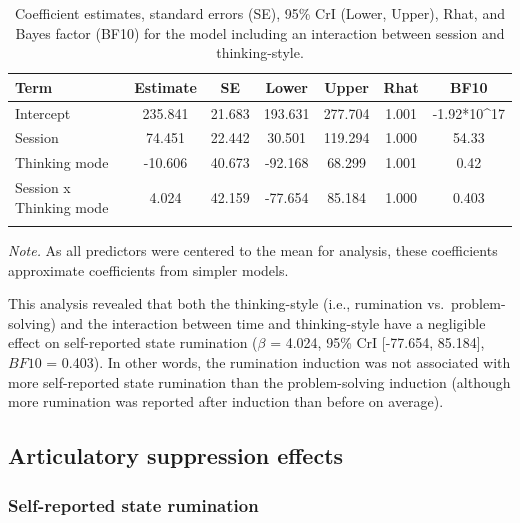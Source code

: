 \documentclass[a4paper,12pt,twoside,onecolumn,openright,final,oldfontcommands]{memoir}
\begin{document}
\begin{table}[H]
\begin{center}
\begin{threeparttable}
\caption{\label{tab:ParamInteraction}Coefficient estimates, standard errors (SE), 95\% CrI (Lower, Upper), Rhat, and Bayes factor (BF10) for the model including an interaction between session and thinking-style.}
\small{
\begin{tabular}{lcccccc}
\toprule
Term & \multicolumn{1}{c}{Estimate} & \multicolumn{1}{c}{SE} & \multicolumn{1}{c}{Lower} & \multicolumn{1}{c}{Upper} & \multicolumn{1}{c}{Rhat} & \multicolumn{1}{c}{BF10}\\
\midrule
Intercept & 235.841 & 21.683 & 193.631 & 277.704 & 1.001 & -1.92*10\textasciicircum{}17\\
Session & 74.451 & 22.442 & 30.501 & 119.294 & 1.000 & 54.33\\
Thinking mode & -10.606 & 40.673 & -92.168 & 68.299 & 1.001 & 0.42\\
Session x Thinking mode & 4.024 & 42.159 & -77.654 & 85.184 & 1.000 & 0.403\\
\bottomrule
\addlinespace
\end{tabular}
}
\begin{tablenotes}[para]
\textit{Note.} As all predictors were centered to the mean for analysis, these coefficients approximate coefficients from simpler models.
\end{tablenotes}
\end{threeparttable}
\end{center}
\end{table}

This analysis revealed that both the thinking-style (i.e., rumination vs.~problem-solving) and the interaction between time and thinking-style have a negligible effect on self-reported state rumination (\(\beta\) = 4.024, 95\% CrI {[}-77.654, 85.184{]}, \(BF10\) = 0.403). In other words, the rumination induction was not associated with more self-reported state rumination than the problem-solving induction (although more rumination was reported after induction than before on average).

\hypertarget{articulatory-suppression-effects-2}{%
\subsection{Articulatory suppression effects}\label{articulatory-suppression-effects-2}}

\hypertarget{self-reported-state-rumination}{%
\subsubsection{Self-reported state rumination}\label{self-reported-state-rumination}}
\end{document}
